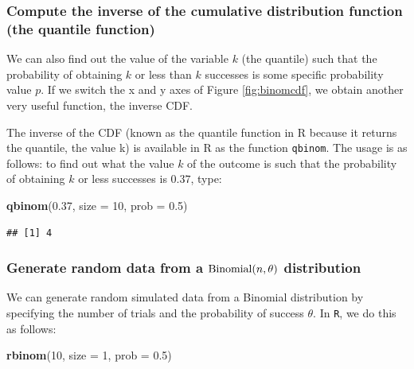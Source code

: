 \documentclass[12pt,]{krantz}
\newenvironment{Shaded}{\begin{snugshade}}{\end{snugshade}}
\newcommand{\DataTypeTok}[1]{\textcolor[rgb]{0.13,0.29,0.53}{#1}}
\newcommand{\DecValTok}[1]{\textcolor[rgb]{0.00,0.00,0.81}{#1}}
\newcommand{\FloatTok}[1]{\textcolor[rgb]{0.00,0.00,0.81}{#1}}
\newcommand{\KeywordTok}[1]{\textcolor[rgb]{0.13,0.29,0.53}{\textbf{#1}}}
\newcommand{\NormalTok}[1]{#1}
\begin{document}
\hypertarget{compute-the-inverse-of-the-cumulative-distribution-function-the-quantile-function}{%
\subsubsection{Compute the inverse of the cumulative distribution function (the quantile function)}\label{compute-the-inverse-of-the-cumulative-distribution-function-the-quantile-function}}

We can also find out the value of the variable \(k\) (the quantile) such that the probability of obtaining \(k\) or less than \(k\) successes is some specific probability value \(p\). If we switch the x and y axes of Figure \ref{fig:binomcdf}, we obtain another very useful function, the inverse CDF.

The inverse of the CDF (known as the quantile function in R because it returns the quantile, the value k) is available in R as the function \texttt{qbinom}. The usage is as follows: to find out what the value \(k\) of the outcome is such that the probability of obtaining \(k\) or less successes is \(0.37\), type:

\begin{Shaded}
\begin{Highlighting}[]
\KeywordTok{qbinom}\NormalTok{(}\FloatTok{0.37}\NormalTok{, }\DataTypeTok{size =} \DecValTok{10}\NormalTok{, }\DataTypeTok{prob =} \FloatTok{0.5}\NormalTok{)}
\end{Highlighting}
\end{Shaded}

\begin{verbatim}
## [1] 4
\end{verbatim}

\hypertarget{generate-random-data-from-a-hboxbinomialntheta-distribution}{%
\subsubsection{\texorpdfstring{Generate random data from a \(\hbox{Binomial}(n,\theta)\) distribution}{Generate random data from a \textbackslash{}hbox\{Binomial\}(n,\textbackslash{}theta) distribution}}\label{generate-random-data-from-a-hboxbinomialntheta-distribution}}

We can generate random simulated data from a Binomial distribution by specifying the number of trials and the probability of success \(\theta\). In \texttt{R}, we do this as follows:

\begin{Shaded}
\begin{Highlighting}[]
\KeywordTok{rbinom}\NormalTok{(}\DecValTok{10}\NormalTok{, }\DataTypeTok{size =} \DecValTok{1}\NormalTok{, }\DataTypeTok{prob =} \FloatTok{0.5}\NormalTok{)}
\end{Highlighting}
\end{Shaded}
\end{document}
